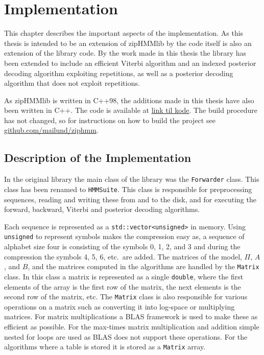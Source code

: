 
\chapter{Implementation}
\label{cha:implementation}

This chapter describes the important aspects of the implementation. As this
thesis is intended to be an extension of zipHMMlib by \citet{sand2013ziphmmlib}
the code itself is also an extension of the library code. By the work made in
this thesis the library has been extended to include an efficient Viterbi
algorithm and an indexed posterior decoding algorithm exploiting
repetitions, as well as a posterior decoding algorithm that does not
exploit repetitions.

As zipHMMlib is written in C++98, the additions made in this thesis have also
been written in C++. The code is available at \url{link til kode}.
 The build procedure has not changed, so for instructions on
how to build the project see \url{github.com/mailund/ziphmm}.

\section{Description of the Implementation}
\label{sec:descr-impl}

In the original library the main class of the library was the
\texttt{Forwarder} class.  This class has been renamed to \texttt{HMMSuite}.
This class is responsible for preprocessing sequences, reading and writing
these from and to the disk, and for executing the forward, backward, Viterbi
and posterior decoding algorithms.

Each sequence is represented as a \texttt{std::vector<unsigned>} in memory.
Using \texttt{unsigned} to represent symbols makes the compression easy as, a
sequence of alphabet size four is consisting of the symbols 0, 1, 2, and 3 and
during the compression the symbols 4, 5, 6, etc.\ are added. The matrices of
the model, $\Pi$, $A$, and $B$, and the matrices computed in the algorithms are
handled by the \texttt{Matrix} class. In this class a matrix is represented as
a single \texttt{double}, where the first elements of the array is the first
row of the matrix, the next elements is the second row of the matrix, etc. The
\texttt{Matrix} class is also responsible for various operations on a matrix
such as converting it into log-space or multiplying matrices. For matrix
multiplications a BLAS framework is used to make these as efficient as
possible. For the max-times matrix multiplication and addition simple nested
for loops are used as BLAS does not support these operations. For the
algorithms where a table is stored it is stored as a \texttt{Matrix} array.

